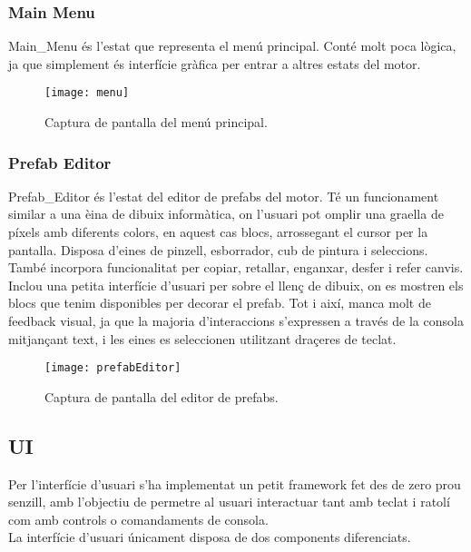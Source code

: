 \subsubsection{Main Menu}
Main\_Menu és l'estat que representa el menú principal. Conté molt poca lògica, ja que simplement és interfície gràfica per entrar a altres estats del motor.
\begin{figure}[H]
  \centering
  \texttt{[image: menu]}
  \caption{Captura de pantalla del menú principal.}
\end{figure}
\subsubsection{Prefab Editor}
Prefab\_Editor és l'estat del editor de prefabs del motor. Té un funcionament similar a una èina de dibuix informàtica, on l'usuari pot omplir una graella de píxels amb diferents colors, en aquest cas blocs, arrossegant el cursor per la pantalla.
Disposa d'eines de pinzell, esborrador, cub de pintura i seleccions. També incorpora funcionalitat per copiar, retallar, enganxar, desfer i refer canvis.
\\
Inclou una petita interfície d'usuari per sobre el llenç de dibuix, on es mostren els blocs que tenim disponibles per decorar el prefab. Tot i així, manca molt de feedback visual, ja que la majoria d'interaccions s'expressen a través de la consola mitjançant text, i les eines es seleccionen utilitzant draçeres de teclat.
\begin{figure}[H]
  \centering
  \texttt{[image: prefabEditor]}
  \caption{Captura de pantalla del editor de prefabs.}
\end{figure}

\subsection{UI}
Per l'interfície d'usuari s'ha implementat un petit framework fet des de zero prou senzill, amb l'objectiu de permetre al usuari interactuar tant amb teclat i ratolí com amb controls o comandaments de consola.
\\
La interfície d'usuari únicament disposa de dos components diferenciats.

